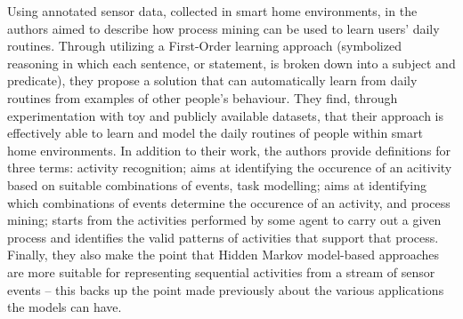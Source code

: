 \documentclass{llncs2e/llncs}
\begin{document}
  Using annotated sensor data, collected in smart home environments, in
  \cite{carolis2015incremental} the authors aimed to describe how process mining
  can be used to learn users' daily routines. Through utilizing a First-Order learning
  approach (symbolized reasoning in which each sentence, or statement, is broken
  down into a subject and predicate), they propose a solution that can automatically
  learn from daily routines from examples of other people's behaviour. They find,
  through experimentation with toy and publicly available datasets, that their approach
  is effectively able to learn and model the daily routines of people within smart
  home environments. In addition to their work, the authors provide definitions
  for three terms: activity recognition; aims at identifying the occurence of an
  acitivity based on suitable combinations of events, task modelling; aims at
  identifying which combinations of events determine the occurence of an activity,
  and process mining; starts from the activities performed by some agent to carry
  out a given process and identifies the valid patterns of activities that support
  that process. Finally, they also make the point that Hidden Markov model-based
  approaches are more suitable for representing sequential activities from a stream
  of sensor events -- this backs up the point made previously about the various
  applications the models can have.

  
  
\end{document}

